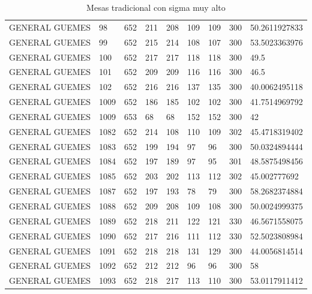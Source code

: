 \documentclass[12pt,a4paper]{article}
\begin{document}
\begin{table}[h!]
\begin{tabular}{lllllllll}
GENERAL GUEMES & 98        & 652          & 211 & 208 & 109 & 109 & 300       & 50.2611927833 \\
GENERAL GUEMES & 99        & 652          & 215 & 214 & 108 & 107 & 300       & 53.5023363976 \\
GENERAL GUEMES & 100       & 652          & 217 & 217 & 118 & 118 & 300       & 49.5          \\
GENERAL GUEMES & 101       & 652          & 209 & 209 & 116 & 116 & 300       & 46.5          \\
GENERAL GUEMES & 102       & 652          & 216 & 216 & 137 & 135 & 300       & 40.0062495118 \\
GENERAL GUEMES & 1009      & 652          & 186 & 185 & 102 & 102 & 300       & 41.7514969792 \\
GENERAL GUEMES & 1009      & 653          & 68  & 68  & 152 & 152 & 300       & 42            \\
GENERAL GUEMES & 1082      & 652          & 214 & 108 & 110 & 109 & 302       & 45.4718319402 \\
GENERAL GUEMES & 1083      & 652          & 199 & 194 & 97  & 96  & 300       & 50.0324894444 \\
GENERAL GUEMES & 1084      & 652          & 197 & 189 & 97  & 95  & 301       & 48.5875498456 \\
GENERAL GUEMES & 1085      & 652          & 203 & 202 & 113 & 112 & 302       & 45.002777692  \\
GENERAL GUEMES & 1087      & 652          & 197 & 193 & 78  & 79  & 300       & 58.2682374884 \\
GENERAL GUEMES & 1088      & 652          & 209 & 208 & 109 & 108 & 300       & 50.0024999375 \\
GENERAL GUEMES & 1089      & 652          & 218 & 211 & 122 & 121 & 330       & 46.5671558075 \\
GENERAL GUEMES & 1090      & 652          & 217 & 216 & 111 & 112 & 330       & 52.5023808984 \\
GENERAL GUEMES & 1091      & 652          & 218 & 218 & 131 & 129 & 300       & 44.0056814514 \\
GENERAL GUEMES & 1092      & 652          & 212 & 212 & 96  & 96  & 300       & 58            \\
GENERAL GUEMES & 1093      & 652          & 218 & 217 & 113 & 110 & 300       & 53.0117911412\\
\hline
\end{tabular}
\caption{Mesas tradicional con sigma muy alto}
\label{table:1}
\end{table}
\end{document}

